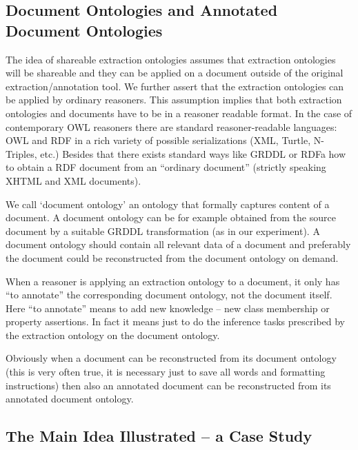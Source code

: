 \subsection{Document Ontologies and Annotated Document Ontologies} \label{sec:onto_doc_ont}

The idea of shareable extraction ontologies assumes that extraction ontologies will be shareable and they can be applied on a document outside of the original extraction/annotation tool. We further assert that the extraction ontologies can be applied by ordinary reasoners. This assumption implies that both extraction ontologies and documents have to be in a reasoner readable format. In the case of contemporary OWL reasoners there are standard reasoner-readable languages: OWL and RDF in a rich variety of possible serializations (XML, Turtle, N-Triples, etc.) Besides that there exists standard ways like GRDDL or RDFa how to obtain a RDF document from an ``ordinary document'' (strictly speaking XHTML and XML documents).

We call `document ontology' an ontology that formally captures content of a document. A document ontology can be for example obtained from the source document by a suitable GRDDL transformation (as in our experiment). A document ontology should contain all relevant data of a document and preferably the document could be reconstructed from the document ontology on demand.

When a reasoner is applying an extraction ontology to a document, it only has ``to annotate'' the corresponding document ontology, not the document itself. Here ``to annotate'' means to add new knowledge -- new class membership or property assertions. In fact it means just to do the inference tasks prescribed by the extraction ontology on the document ontology. 

Obviously when a document can be reconstructed from its document ontology (this is very often true, it is necessary just to save all words and formatting instructions) then also an annotated document can be reconstructed from its annotated document ontology. 





\subsection{The Main Idea Illustrated -- a Case Study} \label{sec:onto_case}

